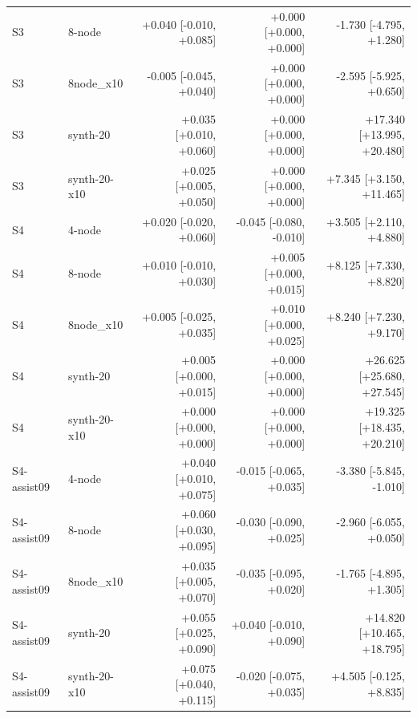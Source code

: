 \begin{table}[htbp]
\begin{tabular}{llrrr}
S3 & 8-node & +0.040 [-0.010, +0.085] & +0.000 [+0.000, +0.000] & -1.730 [-4.795, +1.280] \\
S3 & 8node\_x10 & -0.005 [-0.045, +0.040] & +0.000 [+0.000, +0.000] & -2.595 [-5.925, +0.650] \\
S3 & synth-20 & +0.035 [+0.010, +0.060] & +0.000 [+0.000, +0.000] & +17.340 [+13.995, +20.480] \\
S3 & synth-20-x10 & +0.025 [+0.005, +0.050] & +0.000 [+0.000, +0.000] & +7.345 [+3.150, +11.465] \\
S4 & 4-node & +0.020 [-0.020, +0.060] & -0.045 [-0.080, -0.010] & +3.505 [+2.110, +4.880] \\
S4 & 8-node & +0.010 [-0.010, +0.030] & +0.005 [+0.000, +0.015] & +8.125 [+7.330, +8.820] \\
S4 & 8node\_x10 & +0.005 [-0.025, +0.035] & +0.010 [+0.000, +0.025] & +8.240 [+7.230, +9.170] \\
S4 & synth-20 & +0.005 [+0.000, +0.015] & +0.000 [+0.000, +0.000] & +26.625 [+25.680, +27.545] \\
S4 & synth-20-x10 & +0.000 [+0.000, +0.000] & +0.000 [+0.000, +0.000] & +19.325 [+18.435, +20.210] \\
S4-assist09 & 4-node & +0.040 [+0.010, +0.075] & -0.015 [-0.065, +0.035] & -3.380 [-5.845, -1.010] \\
S4-assist09 & 8-node & +0.060 [+0.030, +0.095] & -0.030 [-0.090, +0.025] & -2.960 [-6.055, +0.050] \\
S4-assist09 & 8node\_x10 & +0.035 [+0.005, +0.070] & -0.035 [-0.095, +0.020] & -1.765 [-4.895, +1.305] \\
S4-assist09 & synth-20 & +0.055 [+0.025, +0.090] & +0.040 [-0.010, +0.090] & +14.820 [+10.465, +18.795] \\
S4-assist09 & synth-20-x10 & +0.075 [+0.040, +0.115] & -0.020 [-0.075, +0.035] & +4.505 [-0.125, +8.835] \\
\bottomrule
\end{tabular}
\end{table}
